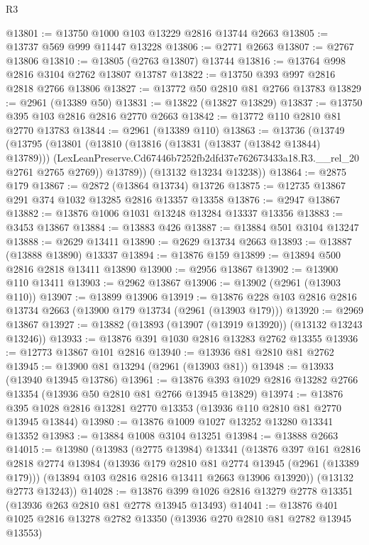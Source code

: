 \begin{lexlean}{R3}
\begin{coremodule}
@13801 := @13750 @1000 @103 @13229 @2816 @13744 @2663
@13805 := @13737 @569 @999 @11447 @13228
@13806 := @2771 @2663
@13807 := @2767 @13806
@13810 := @13805 (@2763 @13807) @13744
@13816 := @13764 @998 @2816 @3104 @2762 @13807 @13787
@13822 := @13750 @393 @997 @2816 @2818 @2766 @13806
@13827 := @13772 @50 @2810 @81 @2766 @13783
@13829 := @2961 (@13389 @50)
@13831 := @13822 (@13827 @13829)
@13837 := @13750 @395 @103 @2816 @2816 @2770 @2663
@13842 := @13772 @110 @2810 @81 @2770 @13783
@13844 := @2961 (@13389 @110)
@13863 := @13736
    (@13749
      (@13795
        (@13801
          (@13810
            (@13816 (@13831 (@13837 (@13842 @13844) @13789)))
            (LexLeanPreserve.Cd67446b7252fb2dfd37e762673433a18.R3.__rel_20 @2761 @2765 @2769))
          @13789))
      (@13132 @13234 @13238))
@13864 := @2875 @179
@13867 := @2872 (@13864 @13734) @13726
@13875 := @12735 @13867 @291 @374 @1032 @13285 @2816 @13357 @13358
@13876 := @2947 @13867
@13882 := @13876 @1006 @1031 @13248 @13284 @13337 @13356
@13883 := @3453 @13867
@13884 := @13883 @426
@13887 := @13884 @501 @3104 @13247
@13888 := @2629 @13411
@13890 := @2629 @13734 @2663
@13893 := @13887 (@13888 @13890) @13337
@13894 := @13876 @159
@13899 := @13894 @500 @2816 @2818 @13411 @13890
@13900 := @2956 @13867
@13902 := @13900 @110 @13411
@13903 := @2962 @13867
@13906 := @13902 (@2961 (@13903 @110))
@13907 := @13899 @13906
@13919 := @13876 @228 @103 @2816 @2816 @13734 @2663 (@13900 @179 @13734 (@2961 (@13903 @179)))
@13920 := @2969 @13867
@13927 := @13882 (@13893 (@13907 (@13919 @13920)) (@13132 @13243 @13246))
@13933 := @13876 @391 @1030 @2816 @13283 @2762 @13355
@13936 := @12773 @13867 @101 @2816
@13940 := @13936 @81 @2810 @81 @2762
@13945 := @13900 @81 @13294 (@2961 (@13903 @81))
@13948 := @13933 (@13940 @13945 @13786)
@13961 := @13876 @393 @1029 @2816 @13282 @2766 @13354 (@13936 @50 @2810 @81 @2766 @13945 @13829)
@13974 := @13876 @395 @1028 @2816 @13281 @2770 @13353 (@13936 @110 @2810 @81 @2770 @13945 @13844)
@13980 := @13876 @1009 @1027 @13252 @13280 @13341 @13352
@13983 := @13884 @1008 @3104 @13251
@13984 := @13888 @2663
@14015 := @13980
    (@13983
      (@2775 @13984)
      @13341
      (@13876
        @397
        @161
        @2816
        @2818
        @2774
        @13984
        (@13936 @179 @2810 @81 @2774 @13945 (@2961 (@13389 @179)))
        (@13894 @103 @2816 @2816 @13411 @2663 @13906 @13920))
      (@13132 @2773 @13243))
@14028 := @13876 @399 @1026 @2816 @13279 @2778 @13351 (@13936 @263 @2810 @81 @2778 @13945 @13493)
@14041 := @13876 @401 @1025 @2816 @13278 @2782 @13350 (@13936 @270 @2810 @81 @2782 @13945 @13553)

\end{coremodule}
\end{lexlean}

